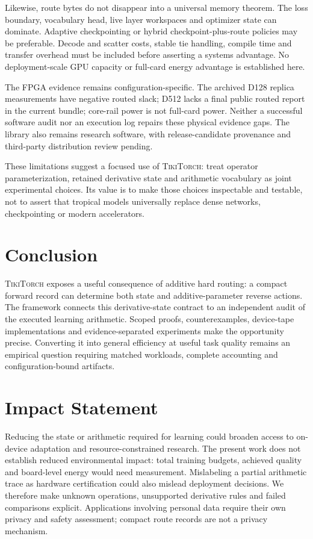 \documentclass{article}
\theoremstyle{plain}
\theoremstyle{definition}
\theoremstyle{remark}
\newcommand{\ttorch}{\textsc{TikiTorch}}
\begin{document}
Likewise, route bytes do not disappear into a universal memory theorem.
The loss boundary, vocabulary head, live layer workspaces and optimizer
state can dominate. Adaptive checkpointing or hybrid checkpoint-plus-route
policies may be preferable. Decode and scatter costs, stable tie handling,
compile time and transfer overhead must be included before asserting a
systems advantage. No deployment-scale GPU capacity or full-card energy
advantage is established here.

The FPGA evidence remains configuration-specific. The archived D128 replica
measurements have negative routed slack; D512 lacks a final public routed
report in the current bundle; core-rail power is not full-card power.
Neither a successful software audit nor an execution log repairs these
physical evidence gaps. The library also remains research software, with
release-candidate provenance and third-party distribution review pending.

These limitations suggest a focused use of \ttorch{}: treat operator
parameterization, retained derivative state and arithmetic vocabulary as
joint experimental choices. Its value is to make those choices inspectable
and testable, not to assert that tropical models universally replace dense
networks, checkpointing or modern accelerators.

\section{Conclusion}

\ttorch{} exposes a useful consequence of additive hard routing: a compact
forward record can determine both state and additive-parameter reverse
actions. The framework connects this derivative-state contract to an
independent audit of the executed learning arithmetic. Scoped proofs,
counterexamples, device-tape implementations and evidence-separated
experiments make the opportunity precise. Converting it into general
efficiency at useful task quality remains an empirical question requiring
matched workloads, complete accounting and configuration-bound artifacts.
\FloatBarrier
\label{main:end}

\section*{Impact Statement}

Reducing the state or arithmetic required for learning could broaden access
to on-device adaptation and resource-constrained research. The present work
does not establish reduced environmental impact: total training budgets,
achieved quality and board-level energy would need measurement. Mislabeling
a partial arithmetic trace as hardware certification could also mislead
deployment decisions. We therefore make unknown operations, unsupported
derivative rules and failed comparisons explicit. Applications involving
personal data require their own privacy and safety assessment; compact
route records are not a privacy mechanism.




\clearpage
\onecolumn
\appendix


\end{document}
